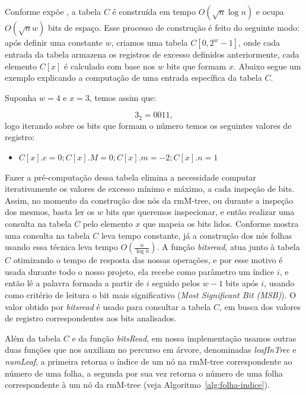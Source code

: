 Conforme expõe \citet{book-compact-data-structures}, a tabela $C$ é construída em tempo $O(\sqrt{n} \log n)$ e ocupa $O(\sqrt{n} w)$ bits de espaço. Esse processo de construção é feito do seguinte modo: após definir uma constante $w$, criamos uma tabela $C[0, 2^w-1]$,  onde cada entrada da tabela armazena os registros de excesso definidos anteriormente, cada elemento $C[x]$ é calculado com base nos $w$ bits  que formam $x$. Abaixo segue um exemplo explicando a computação de uma entrada específica da tabela $C$.
\begin{example}
    Suponha $w=4$ e $x=3$, temos assim que:

    $$3_2 = 0011,$$  logo iterando sobre os bits que formam o número temos os seguintes valores de  registro:
    \begin{itemize}
        \item $C[x].e = 0; C[x].M = 0; C[x].m = -2; C[x].n = 1$
    \end{itemize}
\end{example}

Fazer a pré-computação dessa tabela elimina a necessidade computar iterativamente os valores de excesso mínimo e máximo, a cada inspeção de bits. Assim, no momento da construção dos nós da rmM-tree, ou durante a inspeção dos mesmos, basta ler os $w$ bits que queremos inspecionar, e então realizar uma consulta na tabela $C$ pelo elemento $x$ que mapeia os bits lidos. Conforme mostra \citet{book-compact-data-structures} uma consulta na tabela $C$ leva tempo constante, já a construção dos nós folhas usando essa técnica leva tempo $O(\frac{n}{\log n})$. A função \textit{bitsread}, atua junto à tabela $C$ otimizando o tempo de resposta das nossas operações, e por esse motivo é usada durante todo o nosso projeto, ela recebe como parâmetro um índice $i$, e então lê a palavra formada a partir de $i$ seguido pelos $w-1$ bits após $i$, usando como critério de leitura o bit mais significativo (\textit{Most Significant Bit (MSB)}). O valor obtido por \textit{bitsread} é usado para consultar a tabela $C$, em busca dos valores de registro correspondentes aos bits analisados. 

Além da tabela $C$ e da função \textit{bitsRead}, em nossa implementação usamos outras duas funções que nos auxiliam no  percurso em árvore, denominadas \textit{leafInTree} e \textit{numLeaf}, a primeira retorna o índice de um nó na rmM-tree correspondente ao número de uma folha,  a segunda por sua vez retorna o número de uma folha correspondente à um nó da rmM-tree (veja Algoritmo~\ref{alg:folha-indice}).

